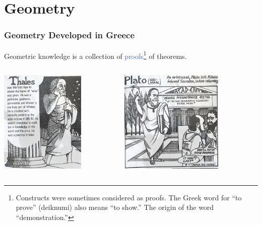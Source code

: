 \documentclass[unicode, 14pt, aspectratio=169]{beamer}
\begin{document}
\section{Geometry}
\begin{frame}
  \frametitle{Geometry Developed in Greece}
  {\large Geometric knowledge is a collection of \textcolor{highlight}{proofs}\footnote{Constructs were sometimes considered as proofs. The Greek word for “to prove” (deiknumi) also means “to show.” The origin of the word “demonstration.”} of theorems.}
\begin{columns}
  \begin{column}{0.25\textwidth}
    \begin{center}
      \includegraphics[width=0.7\textwidth]{images/thales.png}
    \end{center}
  \end{column}
  \begin{column}{0.25\textwidth}
    \begin{center}
      \includegraphics[width=0.7\textwidth]{images/plato.png}

\end{center}
\end{column}
\end{columns}
\end{frame}
\end{document}
